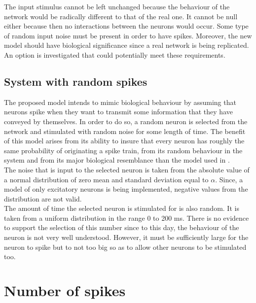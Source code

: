 The input stimulus cannot be left unchanged because the behaviour of the network would be radically different to that of the real one. It cannot be null either because then no interactions between the neurons would occur. Some type of random input noise must be present in order to have spikes. Moreover, the new model should have biological significance since a real network is being replicated. An option is investigated that could potentially meet these requirements.\\

\subsection{System with random spikes}\label{sec:sys_rand_spikes}

The proposed model intends to mimic biological behaviour by assuming that neurons spike when they want to transmit some information that they have conveyed by themselves. In order to do so, a random neuron is selected from the network and stimulated with random noise for some length of time.
The benefit of this model arises from its ability to insure that every neuron has roughly the same probability of originating a spike train, from its random behaviour in the system and from its major biological resemblance than the model used in \cite{alexandru2018estimating}.\\

The noise that is input to the selected neuron is taken from the absolute value of a normal distribution of zero mean and standard deviation equal to \(\alpha\). Since, a model of only excitatory neurons is being implemented, negative values from the distribution are not valid. \\

The amount of time the selected neuron is stimulated for is also random. It is taken from a uniform distribution in the range 0 to 200 ms. There is no evidence to support the selection of this number since to this day, the behaviour of the neuron is not very well understood. However, it must be sufficiently large for the neuron to spike but to not too big so as to allow other neurons to be stimulated too. \\



\section{Number of spikes}\label{sec:number_of_spikes}

